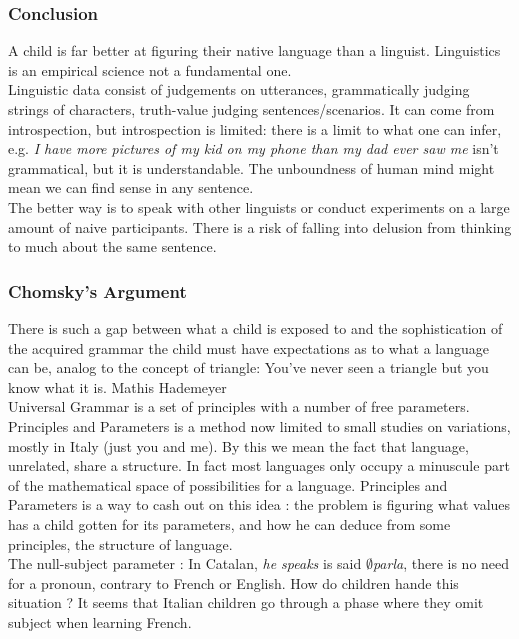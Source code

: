 \documentclass{cours}
\begin{document}
\subsubsection{Conclusion}
A child is far better at figuring their native language than a linguist. Linguistics is an empirical science not a fundamental one. \\
Linguistic data consist of judgements on utterances, grammatically judging strings of characters, truth-value judging sentences/scenarios. It can come from introspection, but introspection is limited: there is a limit to what one can infer, e.g. \textsl{I have more pictures of my kid on my phone than my dad ever saw me} isn't grammatical, but it is understandable. The unboundness of human mind might mean we can find sense in any sentence.\\
The better way is to speak with other linguists or conduct experiments on a large amount of naive participants. There is a risk of falling into delusion from thinking to much about the same sentence. 

\subsubsection{Chomsky's Argument}
There is such a gap between what a child is exposed to and the sophistication of the acquired grammar the child must have expectations as to what a language can be, analog to the concept of triangle: You've never seen a triangle but you know what it is. Mathis Hademeyer\\
Universal Grammar is a set of principles with a number of free parameters. \\
Principles and Parameters is a method now limited to small studies on variations, mostly in Italy (just you and me). By this we mean the fact that language, unrelated, share a structure. In fact most languages only occupy a minuscule part of the mathematical space of possibilities for a language. Principles and Parameters is a way to cash out on this idea : the problem is figuring what values has a child gotten for its parameters, and how he can deduce from some principles, the structure of language. \\
The null-subject parameter : In Catalan, \textsl{he speaks} is said $\emptyset$\!\textsl{parla}, there is no need for a pronoun, contrary to French or English. How do children hande this situation ? It seems that Italian children go through a phase where they omit subject when learning French.
\end{document}
